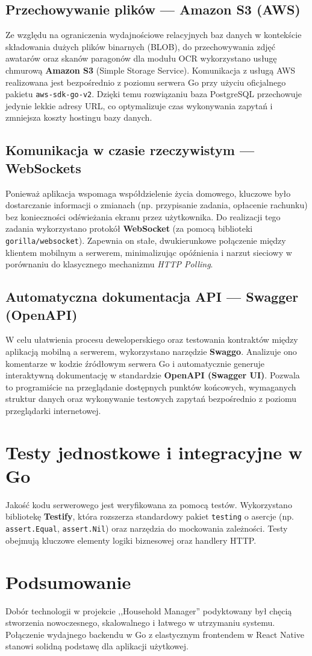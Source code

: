 \subsection{Przechowywanie plików --- Amazon S3 (AWS)}
Ze względu na ograniczenia wydajnościowe relacyjnych baz danych w kontekście składowania dużych plików binarnych (BLOB), do przechowywania zdjęć awatarów oraz skanów paragonów dla modułu OCR wykorzystano usługę chmurową \textbf{Amazon S3} (Simple Storage Service). Komunikacja z usługą AWS realizowana jest bezpośrednio z poziomu serwera Go przy użyciu oficjalnego pakietu \texttt{aws-sdk-go-v2}. Dzięki temu rozwiązaniu baza PostgreSQL przechowuje jedynie lekkie adresy URL, co optymalizuje czas wykonywania zapytań i zmniejsza koszty hostingu bazy danych.

\subsection{Komunikacja w czasie rzeczywistym --- WebSockets}
Ponieważ aplikacja wspomaga współdzielenie życia domowego, kluczowe było dostarczanie informacji o zmianach (np. przypisanie zadania, opłacenie rachunku) bez konieczności odświeżania ekranu przez użytkownika. Do realizacji tego zadania wykorzystano protokół \textbf{WebSocket} (za pomocą biblioteki \texttt{gorilla/websocket}). Zapewnia on stałe, dwukierunkowe połączenie między klientem mobilnym a serwerem, minimalizując opóźnienia i narzut sieciowy w porównaniu do klasycznego mechanizmu \textit{HTTP Polling}.

\subsection{Automatyczna dokumentacja API --- Swagger (OpenAPI)}
W celu ułatwienia procesu deweloperskiego oraz testowania kontraktów między aplikacją mobilną a serwerem, wykorzystano narzędzie \textbf{Swaggo}. Analizuje ono komentarze w kodzie źródłowym serwera Go i automatycznie generuje interaktywną dokumentację w standardzie \textbf{OpenAPI (Swagger UI)}. Pozwala to programiście na przeglądanie dostępnych punktów końcowych, wymaganych struktur danych oraz wykonywanie testowych zapytań bezpośrednio z poziomu przeglądarki internetowej.

\section{Testy jednostkowe i integracyjne w Go}

Jakość kodu serwerowego jest weryfikowana za pomocą testów. Wykorzystano bibliotekę \textbf{Testify}, która rozszerza standardowy pakiet \texttt{testing} o asercje (np. \texttt{assert.Equal}, \texttt{assert.Nil}) oraz narzędzia do mockowania zależności. Testy obejmują kluczowe elementy logiki biznesowej oraz handlery HTTP.

\section{Podsumowanie}

Dobór technologii w projekcie ,,Household Manager'' podyktowany był chęcią stworzenia nowoczesnego, skalowalnego i łatwego w utrzymaniu systemu. Połączenie wydajnego backendu w Go z elastycznym frontendem w React Native stanowi solidną podstawę dla aplikacji użytkowej.
